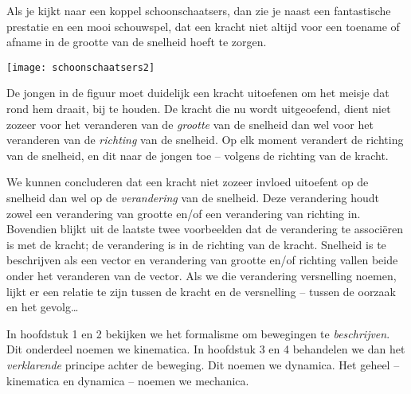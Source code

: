 \documentclass{ximera}
\begin{document}
Als je kijkt naar een koppel schoonschaatsers, dan zie je naast een fantastische prestatie en een mooi schouwspel, dat een kracht niet altijd voor een toename of afname in de grootte van de snelheid hoeft te zorgen. 

\begin{image}
% 
\texttt{[image: schoonschaatsers2]}
\end{image}

De jongen in de figuur moet duidelijk een kracht uitoefenen om het meisje dat rond hem draait, bij te houden. De kracht die nu wordt uitgeoefend, dient niet zozeer voor het veranderen van de \textit{grootte} van de snelheid dan wel voor het veranderen van de \textit{richting} van de snelheid. Op elk moment verandert de richting van de snelheid, en dit naar de jongen toe -- volgens de richting van de kracht.

We kunnen concluderen dat een kracht niet zozeer invloed uitoefent op de snelheid dan wel op de \textit{verandering} van de snelheid. Deze verandering houdt zowel een verandering van grootte en/of een verandering van richting in. Bovendien blijkt uit de laatste twee voorbeelden dat de verandering te associëren is met de kracht; de verandering is in de richting van de kracht. Snelheid is te beschrijven als een vector en verandering van grootte en/of richting vallen beide onder het veranderen van de vector. Als we die verandering versnelling noemen, lijkt er een relatie te zijn tussen de kracht en de versnelling -- tussen de oorzaak en het gevolg\ldots

In hoofdstuk 1 en 2 bekijken we het formalisme om bewegingen te \textit{beschrijven}. Dit onderdeel noemen we kinematica. In hoofdstuk 3 en 4 behandelen we dan het \textit{verklarende} principe achter de beweging. Dit noemen we dynamica. Het geheel -- kinematica en dynamica -- noemen we mechanica.
\end{document}
